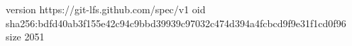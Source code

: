 version https://git-lfs.github.com/spec/v1
oid sha256:bdfd40ab3f155e42c94c9bbd39939c97032c474d394a4fcbcd9f9e31f1cd0f96
size 2051
